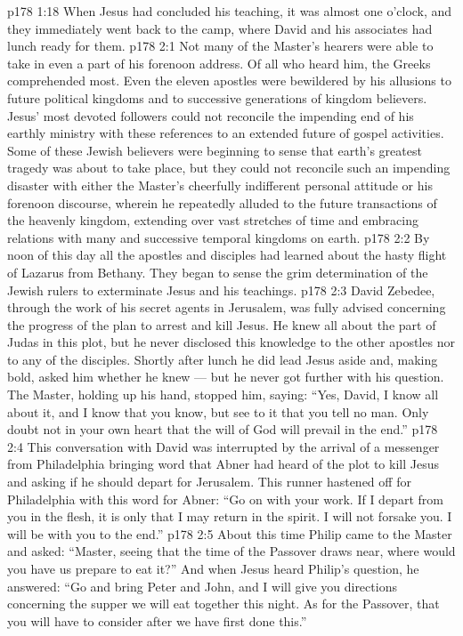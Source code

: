 \vs p178 1:18 \pc When Jesus had concluded his teaching, it was almost one o’clock, and they immediately went back to the camp, where David and his associates had lunch ready for them.
\vs p178 2:1 Not many of the Master’s hearers were able to take in even a part of his forenoon address. Of all who heard him, the Greeks comprehended most. Even the eleven apostles were bewildered by his allusions to future political kingdoms and to successive generations of kingdom believers. Jesus’ most devoted followers could not reconcile the impending end of his earthly ministry with these references to an extended future of gospel activities. Some of these Jewish believers were beginning to sense that earth’s greatest tragedy was about to take place, but they could not reconcile such an impending disaster with either the Master’s cheerfully indifferent personal attitude or his forenoon discourse, wherein he repeatedly alluded to the future transactions of the heavenly kingdom, extending over vast stretches of time and embracing relations with many and successive temporal kingdoms on earth.
\vs p178 2:2 By noon of this day all the apostles and disciples had learned about the hasty flight of Lazarus from Bethany. They began to sense the grim determination of the Jewish rulers to exterminate Jesus and his teachings.
\vs p178 2:3 David Zebedee, through the work of his secret agents in Jerusalem, was fully advised concerning the progress of the plan to arrest and kill Jesus. He knew all about the part of Judas in this plot, but he never disclosed this knowledge to the other apostles nor to any of the disciples. Shortly after lunch he did lead Jesus aside and, making bold, asked him whether he knew --- but he never got further with his question. The Master, holding up his hand, stopped him, saying: \textcolor{ubdarkred}{“Yes, David, I know all about it, and I know that you know, but see to it that you tell no man. Only doubt not in your own heart that the will of God will prevail in the end.”}
\vs p178 2:4 This conversation with David was interrupted by the arrival of a messenger from Philadelphia bringing word that Abner had heard of the plot to kill Jesus and asking if he should depart for Jerusalem. This runner hastened off for Philadelphia with this word for Abner: \textcolor{ubdarkred}{“Go on with your work. If I depart from you in the flesh, it is only that I may return in the spirit. I will not forsake you. I will be with you to the end.”}
\vs p178 2:5 About this time Philip came to the Master and asked: “Master, seeing that the time of the Passover draws near, where would you have us prepare to eat it?” And when Jesus heard Philip’s question, he answered: \textcolor{ubdarkred}{“Go and bring Peter and John, and I will give you directions concerning the supper we will eat together this night. As for the Passover, that you will have to consider after we have first done this.”}
